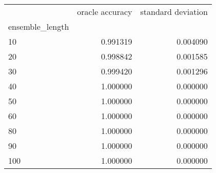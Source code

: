 \begin{tabular}{lrr}
\toprule
{} &  oracle accuracy &  standard deviation \\
ensemble\_length &                  &                     \\
\midrule
10              &         0.991319 &            0.004090 \\
20              &         0.998842 &            0.001585 \\
30              &         0.999420 &            0.001296 \\
40              &         1.000000 &            0.000000 \\
50              &         1.000000 &            0.000000 \\
60              &         1.000000 &            0.000000 \\
80              &         1.000000 &            0.000000 \\
90              &         1.000000 &            0.000000 \\
100             &         1.000000 &            0.000000 \\
\bottomrule
\end{tabular}
